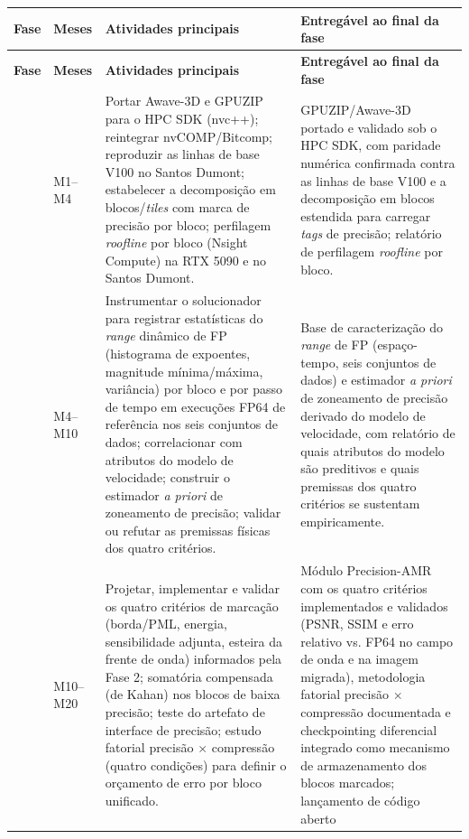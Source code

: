 \documentclass[12pt,a4paper]{article}
\begin{document}
\begin{longtable}{@{}p{}p{}p{}p{}@{}}
\toprule
\textbf{Fase} & \textbf{Meses} & \textbf{Atividades principais} &
\textbf{Entregável ao final da fase}\\
\midrule
\endfirsthead
\toprule
\textbf{Fase} & \textbf{Meses} & \textbf{Atividades principais} &
\textbf{Entregável ao final da fase}\\
\midrule
\endhead
\bottomrule
\endfoot
1 & M1--M4 & Portar Awave-3D e GPUZIP para o HPC SDK (nvc++); reintegrar
nvCOMP/Bitcomp; reproduzir as linhas de base V100 no Santos Dumont;
estabelecer a decomposição em blocos/\emph{tiles} com marca de precisão por
bloco; perfilagem \emph{roofline} por bloco (Nsight Compute) na RTX 5090 e
no Santos Dumont. & GPUZIP/Awave-3D portado e validado sob o HPC SDK, com
paridade numérica confirmada contra as linhas de base V100 e a decomposição
em blocos estendida para carregar \emph{tags} de precisão; relatório de
perfilagem \emph{roofline} por bloco.\\
\addlinespace
2 & M4--M10 & Instrumentar o solucionador para registrar estatísticas do
\emph{range} dinâmico de FP (histograma de expoentes, magnitude
mínima/máxima, variância) por bloco e por passo de tempo em execuções FP64
de referência nos seis conjuntos de dados; correlacionar com atributos do
modelo de velocidade; construir o estimador \emph{a priori} de zoneamento
de precisão; validar ou refutar as premissas físicas dos quatro critérios.
& Base de caracterização do \emph{range} de FP (espaço-tempo, seis
conjuntos de dados) e estimador \emph{a priori} de zoneamento de precisão
derivado do modelo de velocidade, com relatório de quais atributos do
modelo são preditivos e quais premissas dos quatro critérios se sustentam
empiricamente.\\
\addlinespace
3 & M10--M20 & Projetar, implementar e validar os quatro critérios de
marcação (borda/PML, energia, sensibilidade adjunta, esteira da frente de
onda) informados pela Fase 2; somatória compensada (de Kahan) nos blocos de
baixa precisão; teste do artefato de interface de precisão; estudo fatorial
precisão $\times$ compressão (quatro condições) para definir o orçamento de
erro por bloco unificado. & Módulo Precision-AMR com os quatro critérios
implementados e validados (PSNR, SSIM e erro relativo vs. FP64 no campo de
onda e na imagem migrada), metodologia fatorial precisão $\times$
compressão documentada e checkpointing diferencial integrado como
mecanismo de armazenamento dos blocos marcados; lançamento de código aberto

\end{longtable}
\end{document}
